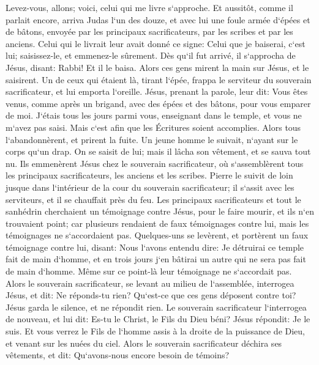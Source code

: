 \verse Levez-vous, allons; voici, celui qui me livre s`approche. 
\verse Et aussitôt, comme il parlait encore, arriva Judas l`un des douze, et avec lui une foule armée d`épées et de bâtons, envoyée par les principaux sacrificateurs, par les scribes et par les anciens. 
\verse Celui qui le livrait leur avait donné ce signe: Celui que je baiserai, c`est lui; saisissez-le, et emmenez-le sûrement. 
\verse Dès qu`il fut arrivé, il s`approcha de Jésus, disant: Rabbi! Et il le baisa. 
\verse Alors ces gens mirent la main sur Jésus, et le saisirent. 
\verse Un de ceux qui étaient là, tirant l`épée, frappa le serviteur du souverain sacrificateur, et lui emporta l`oreille. 
\verse Jésus, prenant la parole, leur dit: Vous êtes venus, comme après un brigand, avec des épées et des bâtons, pour vous emparer de moi. 
\verse J`étais tous les jours parmi vous, enseignant dans le temple, et vous ne m`avez pas saisi. Mais c`est afin que les Écritures soient accomplies. 
\verse Alors tous l`abandonnèrent, et prirent la fuite. 
\verse Un jeune homme le suivait, n`ayant sur le corps qu`un drap. On se saisit de lui; 
\verse mais il lâcha son vêtement, et se sauva tout nu. 
\verse Ils emmenèrent Jésus chez le souverain sacrificateur, où s`assemblèrent tous les principaux sacrificateurs, les anciens et les scribes. 
\verse Pierre le suivit de loin jusque dans l`intérieur de la cour du souverain sacrificateur; il s`assit avec les serviteurs, et il se chauffait près du feu. 
\verse Les principaux sacrificateurs et tout le sanhédrin cherchaient un témoignage contre Jésus, pour le faire mourir, et ils n`en trouvaient point; 
\verse car plusieurs rendaient de faux témoignages contre lui, mais les témoignages ne s`accordaient pas. 
\verse Quelques-uns se levèrent, et portèrent un faux témoignage contre lui, disant: 
\verse Nous l`avons entendu dire: Je détruirai ce temple fait de main d`homme, et en trois jours j`en bâtirai un autre qui ne sera pas fait de main d`homme. 
\verse Même sur ce point-là leur témoignage ne s`accordait pas. 
\verse Alors le souverain sacrificateur, se levant au milieu de l`assemblée, interrogea Jésus, et dit: Ne réponds-tu rien? Qu`est-ce que ces gens déposent contre toi? 
\verse Jésus garda le silence, et ne répondit rien. Le souverain sacrificateur l`interrogea de nouveau, et lui dit: Es-tu le Christ, le Fils du Dieu béni? 
\verse Jésus répondit: Je le suis. Et vous verrez le Fils de l`homme assis à la droite de la puissance de Dieu, et venant sur les nuées du ciel. 
\verse Alors le souverain sacrificateur déchira ses vêtements, et dit: Qu`avons-nous encore besoin de témoins? 
